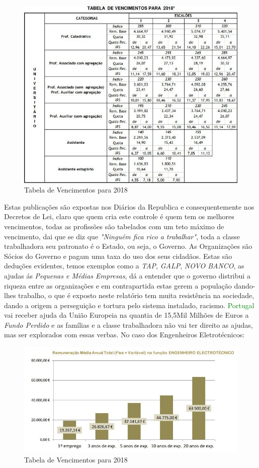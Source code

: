 \begin{figure}[H]
	\centering
	\includegraphics[scale=0.52]{./image/Salary/Universidade.jpg}
	\caption{Tabela de Vencimentos para 2018 \cite{article_2}}
\end{figure}
Estas publicações são expostas nos Diários da Republica e consequentemente nos Decretos de Lei, claro que quem cria este controle é quem tem os melhores vencimentos, todas as profissões são tabelados com um teto máximo de vencimento, dai que se diz que \textit{"Ninguém fica rico a trabalhar"}, toda a classe trabalhadora seu patronato é o Estado, ou seja, o Governo. As Organizações são Sócios do Governo e pagam uma taxa do uso dos seus cidadãos. Estas são deduções evidentes, temos exemplos como a \textit{TAP}, \textit{GALP}, \textit{NOVO BANCO}, as ajudas ás \textit{Pequenas e Médias Empresas}, dá a entender que o governo distribui a riqueza entre as organizações e em contrapartida estas gerem a população dando-lhes trabalho, o que é exposto neste relatório tem muita resistência na sociedade, dando a origem a perseguição e tortura pelo sistema instalado, racismo. \textcolor{green}{Portugal} vai receber ajuda da União Europeia na quantia de 15,5Mil Milhões de Euros a \textit{Fundo Perdido} e as famílias e a classe trabalhadora não vai ter direito as ajudas, mas ser explorados com essas verbas.
\newpage
No caso dos Engenheiros Eletrotécnicos:\\
\begin{figure}[H]
	\centering
	\includegraphics[scale=0.52]{./image/Salary/Eng_Elec.jpg}
	\caption{Tabela de Vencimentos para 2018 \cite{article_3}}
\end{figure}
